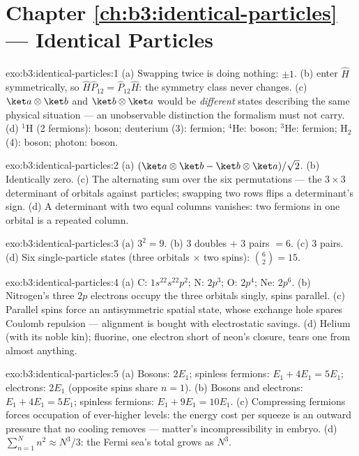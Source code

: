 \section*{Chapter \ref{ch:b3:identical-particles} --- Identical Particles}

\begin{solution}{exo:b3:identical-particles:1}
(a) Swapping twice is doing nothing:  $\pm1$. (b)
 enter $\hat H$ symmetrically, so $\hat H\hat
P_{12} = \hat P_{12}\hat H$: the symmetry class never changes. (c)
$\ket a\otimes\ket b$ and $\ket b\otimes\ket a$ would be
\emph{different} states describing the same physical situation ---
an unobservable distinction the formalism must not carry. (d)
$^1$H (2 fermions): boson; deuterium (3): fermion; $^4$He: boson;
$^3$He: fermion; H$_2$ (4): boson; photon: boson.
\end{solution}

\begin{solution}{exo:b3:identical-particles:2}
(a) $(\ket a\otimes\ket b - \ket b\otimes\ket a)/\sqrt2$. (b)
Identically zero. (c) The alternating sum over the six
permutations --- the $3\times3$ determinant of orbitals against
particles; swapping two rows flips a determinant's sign. (d) A
determinant with two equal columns vanishes: two fermions in one
orbital is a repeated column.
\end{solution}

\begin{solution}{exo:b3:identical-particles:3}
(a) $3^2 = 9$. (b) $3$ doubles $+$ $3$ pairs $= 6$. (c) $3$ pairs.
(d) Six single-particle states (three orbitals $\times$ two spins):
$\binom62 = 15$.
\end{solution}

\begin{solution}{exo:b3:identical-particles:4}
(a) C: $1s^22s^22p^2$; N: $2p^3$; O: $2p^4$; Ne: $2p^6$. (b)
Nitrogen's three $2p$ electrons occupy the three orbitals singly,
spins parallel. (c) Parallel spins force an antisymmetric spatial
state, whose exchange hole spares Coulomb repulsion --- alignment
is bought with electrostatic savings. (d) Helium (with its noble
kin); fluorine, one electron short of neon's closure, tears one
from almost anything.
\end{solution}

\begin{solution}{exo:b3:identical-particles:5}
(a) Bosons: $2E_1$; spinless fermions: $E_1 + 4E_1 = 5E_1$;
electrons: $2E_1$ (opposite spins share $n = 1$). (b) Bosons and
electrons: $E_1 + 4E_1 = 5E_1$; spinless fermions: $E_1 + 9E_1 =
10E_1$. (c) Compressing fermions forces occupation of ever-higher
levels: the energy cost per squeeze is an outward pressure that no
cooling removes --- matter's incompressibility in embryo. (d)
$\sum_{n=1}^N n^2 \approx N^3/3$: the Fermi sea's total grows as
$N^3$.
\end{solution}


